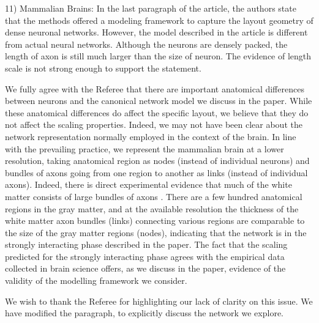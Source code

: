 \documentclass[11pt]{article}
\begin{document}
\begin{response}{
11) Mammalian Brains: In the last paragraph of the article, the authors state that the methods offered a modeling framework to capture the layout geometry of dense neuronal networks. However, the model described in the article is different from actual neural networks. Although the neurons are densely packed, the length of axon is still much larger than the size of neuron. The evidence of length scale is not strong enough to support the statement. 


}
We fully agree with the Referee that there are important anatomical differences between neurons
and the canonical network model we discuss in the paper. 
While %
these anatomical differences do affect the specific layout, we believe that they do not affect the scaling properties. 
Indeed, we may not have been clear about the network  representation normally employed in the context of the brain.
In line with the prevailing practice, we represent the mammalian brain at a lower resolution, taking anatomical region as nodes (instead of individual neurons) and bundles of axons going from one region to another as links (instead of individual axons). 
Indeed, there is direct experimental evidence that 
much of the white matter consists of large bundles of axons \cite{raper2010cellular}.
There are a few hundred anatomical regions in the gray matter, and at the available resolution the thickness of the white matter axon bundles (links) connecting various regions are comparable to the size of the gray matter regions (nodes), 
indicating that the network is in the strongly interacting phase described in the paper. 
The fact that the scaling predicted for the strongly interacting phase agrees with the empirical data collected in brain science offers, as we discuss in the paper, evidence of the validity of the modelling framework we consider. 

We wish to thank the Referee for highlighting our lack of clarity on this issue. We have modified the paragraph, to explicitly discuss the network we explore. 

\end{response}
\end{document}
